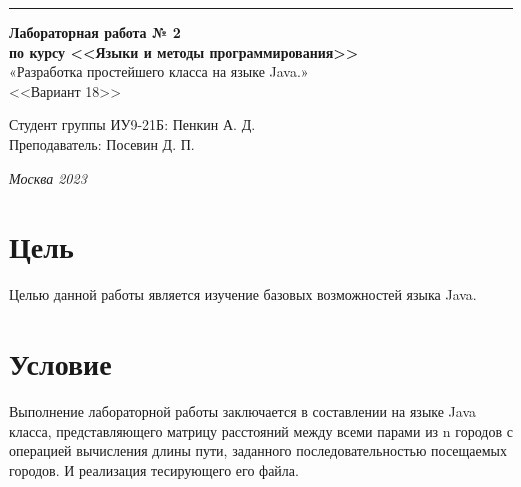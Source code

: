 ﻿\documentclass[a4paper, 12pt]{extarticle}
\begin{document}
\begin{titlepage}
\vspace*{-16pt}
\hspace{30pt}\rule{0.866\textwidth}{0.4pt}
  
\vspace{6em}

\begin{center}
\Large {\bf Лабораторная работа № 2} \\ 
\large {\bf по курсу <<Языки и методы программирования>>} \\ 
\large «Разработка простейшего класса на языке Java.» \\
\large <<Вариант 18>>
\end{center}\normalsize

\vspace{15em}


\begin{flushright}
  {Студент группы ИУ9-21Б: Пенкин А. Д.\hspace*{15pt} \\
  \vspace{2ex}
  Преподаватель: Посевин Д. П.\hspace*{15pt}}
\end{flushright}

\bigskip

\vfill
 \vspace{7em}

\begin{center}
\textsl{Москва 2023}
\end{center}
\end{titlepage}

\renewcommand{\ttdefault}{pcr}

\setlength{\tabcolsep}{3pt}
\newpage
\setcounter{page}{2}

\section{Цель}\label{Sect::task}
\par
Целью данной работы является изучение базовых возможностей языка Java.
\section{Условие}
Выполнение лабораторной работы заключается в составлении на языке Java класса, представляющего матрицу расстояний между всеми парами из n городов с операцией вычисления длины пути, заданного последовательностью посещаемых городов. И реализация тесирующего его файла.
\end{document}
